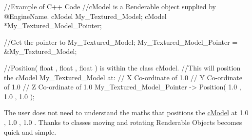 \begin{DoxyCode}
 //Example of C++ Code
 //cModel is a Renderable object supplied by @EngineName.
 cModel My_Textured_Model;
 cModel *My_Textured_Model_Pointer;

 //Get the pointer to My_Textured_Model;
 My_Textured_Model_Pointer = &My_Textured_Model;

 //Position( float , float , float ) is within the class cModel.
 //This will position the cModel My_Textured_Model at:
 // X Co-ordinate of 1.0
 // Y Co-ordinate of 1.0
 // Z Co-ordinate of 1.0
 My_Textured_Model_Pointer -> Position( 1.0 , 1.0 , 1.0 );
\end{DoxyCode}
 The user does not need to understand the maths that positions the \hyperlink{classc_model}{cModel} at 1.0 , 1.0 , 1.0 . Thanks to classes moving and rotating Renderable Objects becomes quick and simple. \par


